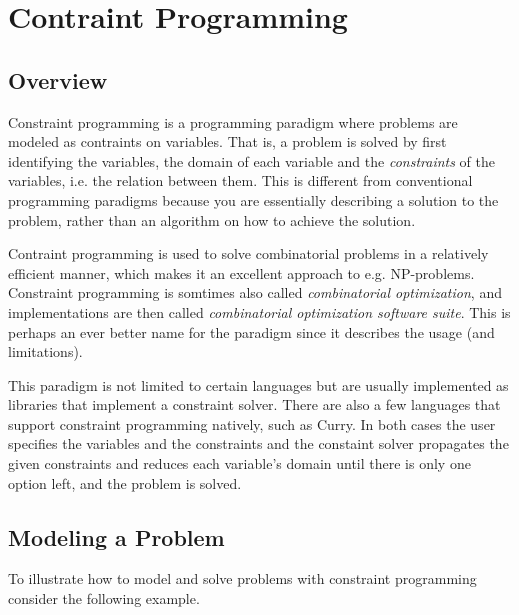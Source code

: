 \section{Contraint Programming}

\subsection{Overview}

Constraint programming is a programming paradigm where problems are modeled as contraints
on variables. That is, a problem is solved by first identifying the variables, the domain
of each variable and the \textit{constraints} of the variables, i.e. the relation between them.
This is different from conventional programming paradigms because you are essentially
describing a solution to the problem, rather than an algorithm on how to achieve the solution.

Contraint programming is used to solve combinatorial problems in a relatively efficient
manner, which makes it an excellent approach to e.g. NP-problems. Constraint programming
is somtimes also called \textit{combinatorial optimization}, and implementations are then
called \textit{combinatorial optimization software suite}. This is perhaps an ever better
name for the paradigm since it describes the usage (and limitations).

This paradigm is not limited to certain languages but are usually implemented as libraries
that implement a constraint solver. There are also a few languages that support constraint
programming natively, such as Curry.
In both cases the user specifies the variables and
the constraints and the constaint solver propagates the given constraints and reduces each
variable's domain until there is only one option left, and the problem is solved.

\subsection{Modeling a Problem}

To illustrate how to model and solve problems with constraint programming consider the
following example.


